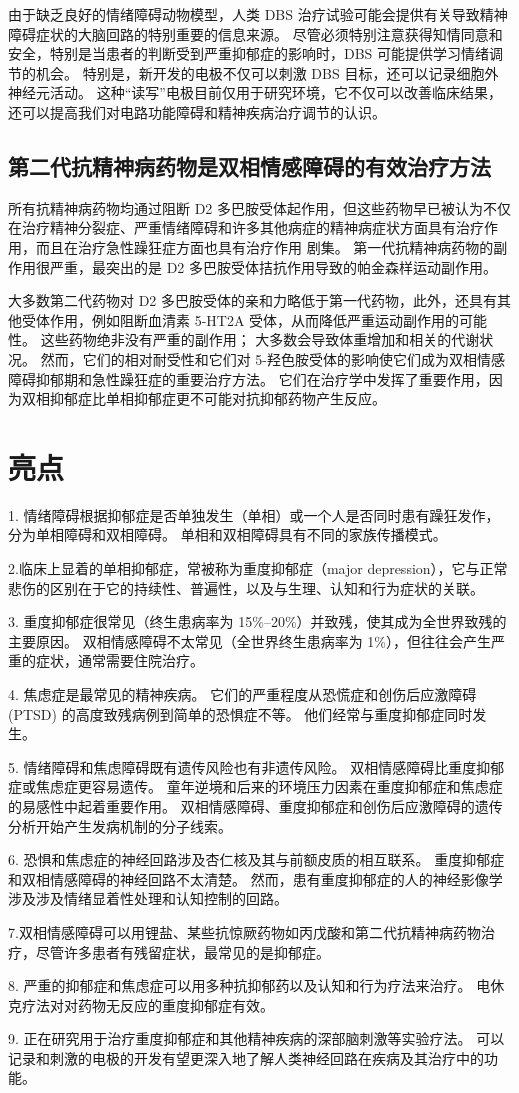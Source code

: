 由于缺乏良好的情绪障碍动物模型，人类 DBS 治疗试验可能会提供有关导致精神障碍症状的大脑回路的特别重要的信息来源。
尽管必须特别注意获得知情同意和安全，特别是当患者的判断受到严重抑郁症的影响时，DBS 可能提供学习情绪调节的机会。
特别是，新开发的电极不仅可以刺激 DBS 目标，还可以记录细胞外神经元活动。
这种“读写”电极目前仅用于研究环境，它不仅可以改善临床结果，还可以提高我们对电路功能障碍和精神疾病治疗调节的认识。



\subsection{第二代抗精神病药物是双相情感障碍的有效治疗方法}

所有抗精神病药物均通过阻断 D2 多巴胺受体起作用，但这些药物早已被认为不仅在治疗精神分裂症、严重情绪障碍和许多其他病症的精神病症状方面具有治疗作用，而且在治疗急性躁狂症方面也具有治疗作用 剧集。
第一代抗精神病药物的副作用很严重，最突出的是 D2 多巴胺受体拮抗作用导致的帕金森样运动副作用。


大多数第二代药物对 D2 多巴胺受体的亲和力略低于第一代药物，此外，还具有其他受体作用，例如阻断血清素 5-HT2A 受体，从而降低严重运动副作用的可能性。
这些药物绝非没有严重的副作用；
大多数会导致体重增加和相关的代谢状况。
然而，它们的相对耐受性和它们对 5-羟色胺受体的影响使它们成为双相情感障碍抑郁期和急性躁狂症的重要治疗方法。
它们在治疗学中发挥了重要作用，因为双相抑郁症比单相抑郁症更不可能对抗抑郁药物产生反应。



\section{亮点}

1. 情绪障碍根据抑郁症是否单独发生（单相）或一个人是否同时患有躁狂发作，分为单相障碍和双相障碍。
单相和双相障碍具有不同的家族传播模式。 


2.临床上显着的单相抑郁症，常被称为重度抑郁症（major depression），它与正常悲伤的区别在于它的持续性、普遍性，以及与生理、认知和行为症状的关联。


3. 重度抑郁症很常见（终生患病率为 15\%–20\%）并致残，使其成为全世界致残的主要原因。
双相情感障碍不太常见（全世界终生患病率为 1\%），但往往会产生严重的症状，通常需要住院治疗。 


4. 焦虑症是最常见的精神疾病。 它们的严重程度从恐慌症和创伤后应激障碍 (PTSD) 的高度致残病例到简单的恐惧症不等。
他们经常与重度抑郁症同时发生。


5. 情绪障碍和焦虑障碍既有遗传风险也有非遗传风险。
双相情感障碍比重度抑郁症或焦虑症更容易遗传。
童年逆境和后来的环境压力因素在重度抑郁症和焦虑症的易感性中起着重要作用。
双相情感障碍、重度抑郁症和创伤后应激障碍的遗传分析开始产生发病机制的分子线索。


6. 恐惧和焦虑症的神经回路涉及杏仁核及其与前额皮质的相互联系。
重度抑郁症和双相情感障碍的神经回路不太清楚。
然而，患有重度抑郁症的人的神经影像学涉及涉及情绪显着性处理和认知控制的回路。


7.双相情感障碍可以用锂盐、某些抗惊厥药物如丙戊酸和第二代抗精神病药物治疗，尽管许多患者有残留症状，最常见的是抑郁症。


8. 严重的抑郁症和焦虑症可以用多种抗抑郁药以及认知和行为疗法来治疗。
电休克疗法对对药物无反应的重度抑郁症有效。


9. 正在研究用于治疗重度抑郁症和其他精神疾病的深部脑刺激等实验疗法。
可以记录和刺激的电极的开发有望更深入地了解人类神经回路在疾病及其治疗中的功能。




